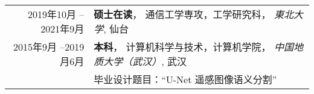 %
%



\begin{tabular}{rl}	
	\textsc{2019年10月 -- 2021年9月}			  & \textbf{硕士在读}， 通信工学専攻，工学研究科， \emph{東北大学}, 仙台\\
	\textsc{2015年9月 --2019月6月} 	&  \textbf{本科}， 计算机科学与技术，计算机学院， \emph{中国地质大学（武汉）}, 武汉\\
									&  毕业设计题目：``U-Net 遥感图像语义分割''\\	
\end{tabular}